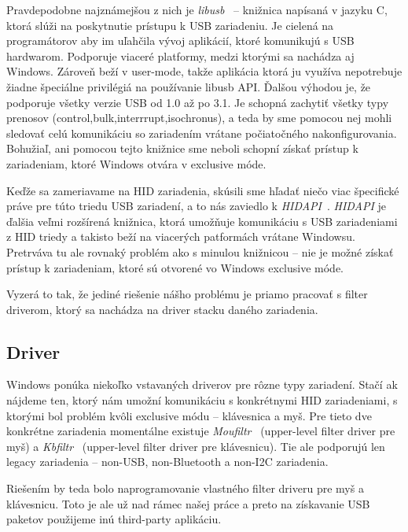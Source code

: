 Pravdepodobne najznámejšou z nich je \textit{libusb}~\cite{libusb} -- knižnica napísaná v jazyku C, ktorá slúži na poskytnutie prístupu k USB zariadeniu. Je cielená na programátorov aby im uľahčila vývoj aplikácií, ktoré komunikujú s USB hardwarom. Podporuje viaceré platformy, medzi ktorými sa nachádza aj Windows. Zároveň beží v user-mode, takže aplikácia ktorá ju využíva nepotrebuje žiadne špeciálne privilégiá na používanie libusb API. Ďalšou výhodou je, že podporuje všetky verzie USB od 1.0 až po 3.1. Je schopná zachytiť všetky typy prenosov (control,bulk,interrrupt,isochronus), a teda by sme pomocou nej mohli sledovať celú komunikáciu so zariadením vrátane počiatočného nakonfigurovania. Bohužiaľ, ani pomocou tejto knižnice sme neboli schopní získať prístup k zariadeniam, ktoré Windows otvára v exclusive móde.

Keďže sa zameriavame na HID zariadenia, skúsili sme hľadať niečo viac špecifické práve pre túto triedu USB zariadení, a to nás zaviedlo k \textit{HIDAPI}~\cite{hidapi_library}. \textit{HIDAPI} je ďalšia veľmi rozšírená knižnica, ktorá umožňuje komunikáciu s USB zariadeniami z HID triedy a takisto beží na viacerých patformách vrátane Windowsu. Pretrváva tu ale rovnaký problém ako s minulou knižnicou -- nie je možné získať prístup k zariadeniam, ktoré sú otvorené vo Windows exclusive móde.

Vyzerá to tak, že jediné riešenie nášho problému je priamo pracovať s filter driverom, ktorý sa nachádza na driver stacku daného zariadenia.

\subsection{Driver}
Windows ponúka niekoľko vstavaných driverov pre rôzne typy zariadení. Stačí ak nájdeme ten, ktorý nám umožní komunikáciu s konkrétnymi HID zariadeniami, s ktorými bol problém kvôli exclusive módu -- klávesnica a myš. Pre tieto dve konkrétne zariadenia momentálne existuje \textit{Moufiltr}~\cite{moufiltr} (upper-level filter driver pre myš) a \textit{Kbfiltr}~\cite{kbfiltr} (upper-level filter driver pre klávesnicu). Tie ale podporujú len legacy zariadenia -- non-USB, non-Bluetooth a non-I2C zariadenia.

Riešením by teda bolo naprogramovanie vlastného filter driveru pre myš a klávesnicu. Toto je ale už nad rámec našej práce a preto na získavanie USB paketov použijeme inú third-party aplikáciu.

